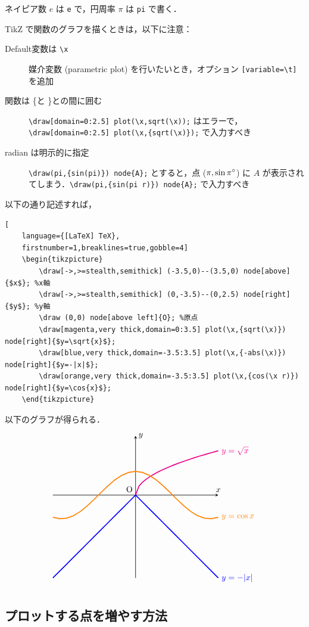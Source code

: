 \documentclass[lualatex]{jlreq}
\begin{document}
ネイピア数 \(e \) は \verb|e| で，円周率 \(\pi \) は \verb|pi| で書く．

TikZ で関数のグラフを描くときは，以下に注意：
\begin{description}
    \item[Default変数は \texttt{\textbackslash x}] 媒介変数 (parametric plot) を行いたいとき，オプション \verb|[variable=\t]| を追加 %
    \item[関数は \{と \}との間に囲む] \verb|\draw[domain=0:2.5] plot(\x,sqrt(\x));| はエラーで，\\
          \verb|\draw[domain=0:2.5] plot(\x,{sqrt(\x)});| で入力すべき
    \item[radian は明示的に指定] \verb|\draw(pi,{sin(pi)}) node{A};| とすると，点 (\(\pi, \sin \qty[parse-numbers=false]{\pi}{\degree}\)) に \(A \) が表示されてしまう．\verb|\draw(pi,{sin(pi r)}) node{A};| で入力すべき
\end{description}

以下の通り記述すれば，
\begin{lstlisting}[
    language={[LaTeX] TeX},
    firstnumber=1,breaklines=true,gobble=4]
    \begin{tikzpicture}
        \draw[->,>=stealth,semithick] (-3.5,0)--(3.5,0) node[above]{$x$}; %x軸
        \draw[->,>=stealth,semithick] (0,-3.5)--(0,2.5) node[right]{$y$}; %y軸
        \draw (0,0) node[above left]{O}; %原点
        \draw[magenta,very thick,domain=0:3.5] plot(\x,{sqrt(\x)}) node[right]{$y=\sqrt{x}$};
        \draw[blue,very thick,domain=-3.5:3.5] plot(\x,{-abs(\x)}) node[right]{$y=-|x|$};
        \draw[orange,very thick,domain=-3.5:3.5] plot(\x,{cos(\x r)}) node[right]{$y=\cos{x}$};
    \end{tikzpicture}
\end{lstlisting}
以下のグラフが得られる．
\[
    \begin{tikzpicture}
    \draw[->,>=stealth,semithick] (-3.5,0)--(3.5,0) node[above]{$x$}; %
    \draw[->,>=stealth,semithick] (0,-3.5)--(0,2.5) node[right]{$y$}; %
    \draw (0,0) node[above left]{O}; %
    \draw[magenta,very thick,domain=0:3.5] plot(\x,{sqrt(\x)}) node[right]{$y=\sqrt{x}$};
    \draw[blue,very thick,domain=-3.5:3.5] plot(\x,{-abs(\x)}) node[right]{$y=-|x|$};
    \draw[orange,very thick,domain=-3.5:3.5] plot(\x,{cos(\x r)}) node[right]{$y=\cos{x}$};
    \end{tikzpicture}
\]

\subsection{プロットする点を増やす方法}
\end{document}
